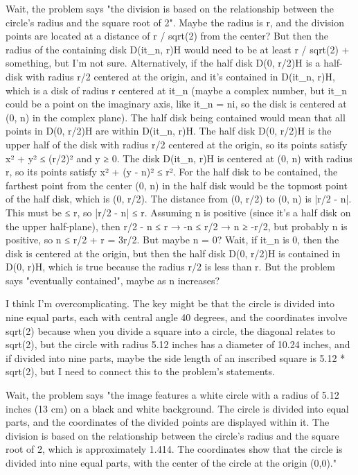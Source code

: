 Wait, the problem says "the division is based on the relationship between the circle's radius and the square root of 2". Maybe the radius is r, and the division points are located at a distance of r / sqrt(2) from the center? But then the radius of the containing disk D(it_n, r)H would need to be at least r / sqrt(2) + something, but I'm not sure. Alternatively, if the half disk D(0, r/2)H is a half-disk with radius r/2 centered at the origin, and it's contained in D(it_n, r)H, which is a disk of radius r centered at it_n (maybe a complex number, but it_n could be a point on the imaginary axis, like it_n = ni, so the disk is centered at (0, n) in the complex plane). The half disk being contained would mean that all points in D(0, r/2)H are within D(it_n, r)H. The half disk D(0, r/2)H is the upper half of the disk with radius r/2 centered at the origin, so its points satisfy x² + y² ≤ (r/2)² and y ≥ 0. The disk D(it_n, r)H is centered at (0, n) with radius r, so its points satisfy x² + (y - n)² ≤ r². For the half disk to be contained, the farthest point from the center (0, n) in the half disk would be the topmost point of the half disk, which is (0, r/2). The distance from (0, r/2) to (0, n) is |r/2 - n|. This must be ≤ r, so |r/2 - n| ≤ r. Assuming n is positive (since it's a half disk on the upper half-plane), then r/2 - n ≤ r → -n ≤ r/2 → n ≥ -r/2, but probably n is positive, so n ≤ r/2 + r = 3r/2. But maybe n = 0? Wait, if it_n is 0, then the disk is centered at the origin, but then the half disk D(0, r/2)H is contained in D(0, r)H, which is true because the radius r/2 is less than r. But the problem says "eventually contained", maybe as n increases? 

I think I'm overcomplicating. The key might be that the circle is divided into nine equal parts, each with central angle 40 degrees, and the coordinates involve sqrt(2) because when you divide a square into a circle, the diagonal relates to sqrt(2), but the circle with radius 5.12 inches has a diameter of 10.24 inches, and if divided into nine parts, maybe the side length of an inscribed square is 5.12 * sqrt(2), but I need to connect this to the problem's statements. 

Wait, the problem says "the image features a white circle with a radius of 5.12 inches (13 cm) on a black and white background. The circle is divided into equal parts, and the coordinates of the divided points are displayed within it. The division is based on the relationship between the circle's radius and the square root of 2, which is approximately 1.414. The coordinates show that the circle is divided into nine equal parts, with the center of the circle at the origin (0,0)." 

